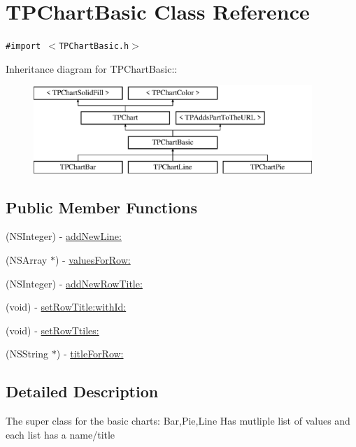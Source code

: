 \hypertarget{interface_t_p_chart_basic}{
\section{TPChartBasic Class Reference}
\label{interface_t_p_chart_basic}
}
{\tt \#import $<$TPChartBasic.h$>$}

Inheritance diagram for TPChartBasic::\begin{figure}[H]
\begin{center}
\leavevmode
\includegraphics[height=3.31361cm]{interface_t_p_chart_basic}
\end{center}
\end{figure}
\subsection*{Public Member Functions}
\begin{CompactItemize}
\item 
(NSInteger) - \hyperlink{interface_t_p_chart_basic_a41306abeba81e4799c5b45eff1fefea}{addNewLine:}
\item 
(NSArray $\ast$) - \hyperlink{interface_t_p_chart_basic_55444751da9bebff034548c8a8c9c05a}{valuesForRow:}
\item 
(NSInteger) - \hyperlink{interface_t_p_chart_basic_dbaf4e508385b4d2b56ff1c5b26fa518}{addNewRowTitle:}
\item 
(void) - \hyperlink{interface_t_p_chart_basic_ac52ed925271b579ff3ec12835ed4179}{setRowTitle:withId:}
\item 
(void) - \hyperlink{interface_t_p_chart_basic_a60b292eef70dacf23030a75f4fd0dd8}{setRowTtiles:}
\item 
(NSString $\ast$) - \hyperlink{interface_t_p_chart_basic_29c20cc728ebf4bca74d1cc0acc51841}{titleForRow:}
\end{CompactItemize}


\subsection{Detailed Description}
The super class for the basic charts: Bar,Pie,Line Has mutliple list of values and each list has a name/title 

